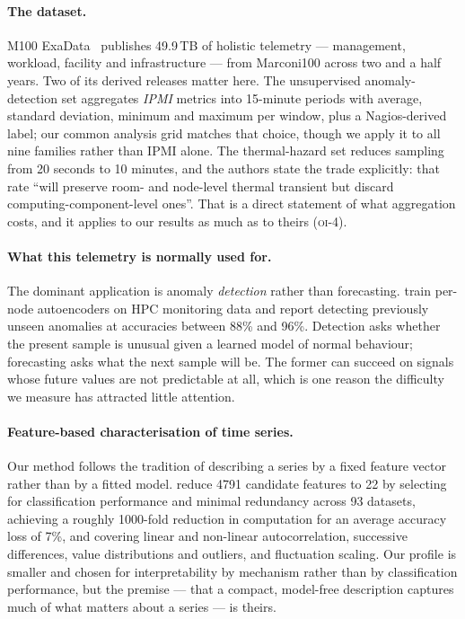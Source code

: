 \documentclass[11pt,a4paper]{article}
\newcommand{\oi}[1]{\textsc{oi-#1}}
\begin{document}
\paragraph{The dataset.} M100 ExaData~\citep{borghesi2023m100} publishes 49.9\,TB
of holistic telemetry --- management, workload, facility and infrastructure ---
from Marconi100 across two and a half years. Two of its derived releases matter
here. The unsupervised anomaly-detection set aggregates \emph{IPMI} metrics into
15-minute periods with average, standard deviation, minimum and maximum per
window, plus a Nagios-derived label; our common analysis grid matches that
choice, though we apply it to all nine families rather than IPMI alone. The
thermal-hazard set reduces sampling from 20 seconds to 10 minutes, and the
authors state the trade explicitly: that rate ``will preserve room- and
node-level thermal transient but discard computing-component-level ones''. That
is a direct statement of what aggregation costs, and it applies to our results
as much as to theirs (\oi{4}).

\paragraph{What this telemetry is normally used for.} The dominant application
is anomaly \emph{detection} rather than forecasting.
\citet{borghesi2019anomaly} train per-node autoencoders on HPC monitoring data
and report detecting previously unseen anomalies at accuracies between 88\% and
96\%. Detection asks whether the present sample is unusual given a learned model
of normal behaviour; forecasting asks what the next sample will be. The former
can succeed on signals whose future values are not predictable at all, which is
one reason the difficulty we measure has attracted little attention.

\paragraph{Feature-based characterisation of time series.} Our method follows the
tradition of describing a series by a fixed feature vector rather than by a
fitted model. \citet{lubba2019catch22} reduce 4791 candidate features to 22 by
selecting for classification performance and minimal redundancy across 93
datasets, achieving a roughly 1000-fold reduction in computation for an average
accuracy loss of 7\%, and covering linear and non-linear autocorrelation,
successive differences, value distributions and outliers, and fluctuation
scaling. Our profile is smaller and chosen for interpretability by mechanism
rather than by classification performance, but the premise --- that a compact,
model-free description captures much of what matters about a series --- is
theirs.
\end{document}
